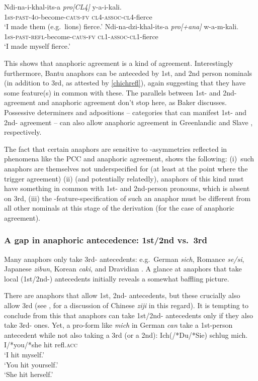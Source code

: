 \documentclass[output=paper, modfonts, nonflat]{langsci/langscibook}
\begin{document}
\ea\label{chichadj}\gll Ndi-na-i-khal-its-a \textit{pro[CL4]} y-a-i-kali.\\
1s\textsc{s}-\textsc{past-4o}-become-\textsc{caus-fv} {} \textsc{cl4-assoc-cl4}-fierce\\
\glt `I made them (e.g.\ lions) fierce.'
\ex\label{chichrefl}\gll Ndi-na-dzi-khal-its-a \textit{pro[+ana]} w-a-m-kali.\\
1s\textsc{s}-\textsc{past-refl-}become-\textsc{caus-fv} {} \textsc{cl1-assoc-cl1-}fierce\\
\glt `I made myself fierce.'
\z

\noindent This shows that anaphoric agreement is a kind of \person{}
agreement. Interestingly furthermore, Bantu anaphors can be anteceded
by 1st, and 2nd person nominals (in addition to 3rd, as attested by
\ref{chichrefl}), again suggesting that they have some feature(s) in
common with these. The parallels between 1st- and 2nd-\person{}
agreement and anaphoric agreement don't stop here, as Baker
discusses. Possessive determiners and adpositions -- categories that
can manifest 1st- and 2nd-\person{} agreement -- can also allow
anaphoric agreement in Greenlandic \citep{bittner:1994} and Slave
\citep{rice:1989}, respectively.


The fact that certain anaphors are sensitive to \person-asymmetries
reflected in phenomena like the PCC and anaphoric agreement, shows the
following: (i)~such anaphors are themselves not underspecified for
\person{} (at least at the point where the trigger agreement) (ii)
(and potentially relatedly), anaphors of this kind must have something
in common with 1st- and 2nd-person pronouns, which is absent on 3rd,
(iii) the \ph-feature-specification of such an anaphor must be
different from all other nominals at this stage of the derivation (for
the case of anaphoric agreement). 

\subsubsection{A gap in anaphoric antecedence: 1st/2nd vs.\ 3rd}

Many anaphors only take 3rd-\person{} antecedents: e.g.\ German
\textit{sich}, Romance \textit{se/si}, Japanese \textit{zibun}, Korean
\textit{caki}, and Dravidian \taan. A glance at anaphors that take
local (1st/2nd-\person) antecedents initially reveals a somewhat
baffling picture.

There are anaphors that allow 1st, 2nd-\person{} antecedents, but
these crucially also allow 3rd (see \citealt{huangliu:2001}, for a
discussion of Chinese \textit{ziji} in this
regard). It is tempting to conclude from this that anaphors can take
1st/2nd-\person{} antecedents only if they also take 3rd-\person{}
ones.  Yet, a pro-form like \textit{mich} in German \emph{can} take a
1st-person antecedent while not also taking a 3rd (or a 2nd):
\ea\label{ichgood}\gll Ich(/*Du/*Sie) schlug mich.\\
I/*you/*she hit refl.{\scshape acc}\\
\glt `I hit myself.'\\
 `You hit yourself.'\\
 `She hit herself.'  \z
\end{document}
